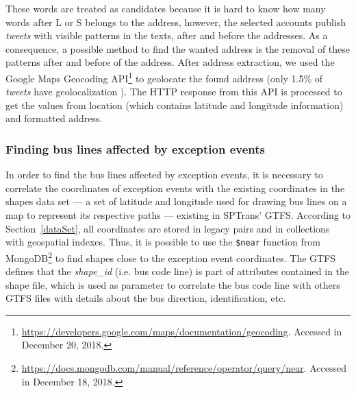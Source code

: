 \documentclass[runningheads]{llncs}
\begin{document}
These words are treated as candidates because it is hard to know how many words after L or S belongs to the address, however, the selected accounts publish \textit{tweets} with visible patterns in the texts, after and before the addresses. As a consequence, a possible method to find the wanted address is the removal of these patterns after and before of the address. After address extraction, we used the Google Maps Geocoding API\footnote{\url{https://developers.google.com/maps/documentation/geocoding}. Accessed in December 20, 2018.} to geolocate the found address (only 1.5\% of \textit{tweets} have geolocalization \cite{niu2016community}).
The HTTP response from this API is processed to get the values from location (which contains latitude and longitude information) and formatted address.


\subsubsection{Finding bus lines affected by exception events}

In order to find the bus lines affected by exception events, it is necessary to correlate the coordinates of exception events with the existing coordinates in the shapes data set --- a set of latitude and longitude used for drawing bus lines on a map to represent its respective paths --- existing in SPTrans' GTFS. According to Section~\ref{dataSet}, all coordinates are stored in legacy pairs and in collections with geospatial indexes. Thus, it is possible to use the \texttt{\$near} function from MongoDB\footnote{\url{https://docs.mongodb.com/manual/reference/operator/query/near}. Accessed in December 18, 2018.} to find shapes close to the exception event coordinates. The GTFS defines that the \textit{shape\_id} (i.e. bus code line) is part of attributes contained in the shape file, which is used as parameter to correlate the bus code line with others GTFS files with details about the bus direction, identification, etc.
\end{document}
